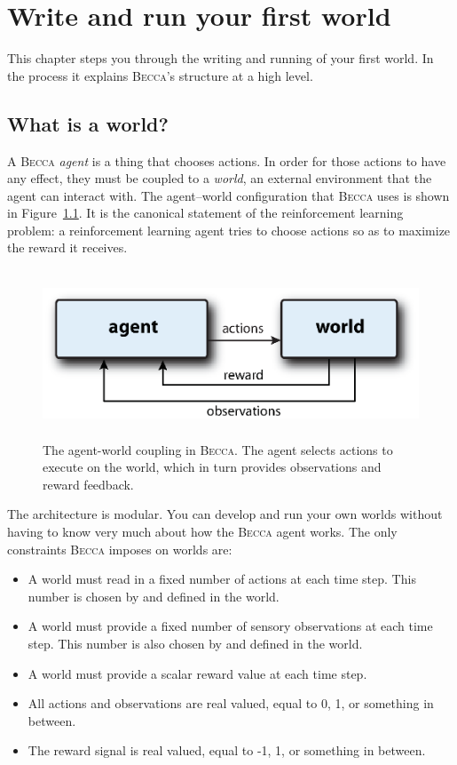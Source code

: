 \chapter{Write and run your first world}

This chapter steps you through the writing and running of your first world. In the process it explains \textsc{Becca}'s structure at a high level.

\section{What is a world?}

A \textsc{Becca} {\em agent} is a thing that chooses actions. In order for those actions to have any effect, they must be coupled to a {\em world}, an external environment that the agent can interact with. The agent--world configuration that \textsc{Becca} uses is shown in Figure~\ref{agent_world}. It is the canonical statement of the reinforcement learning problem: a reinforcement learning agent tries to choose actions so as to maximize the reward it receives.~\cite{sutton98} 

\begin{figure}
\centering
\includegraphics[height=5.0cm]{figs/agent_world.eps}
\caption{The agent-world coupling in \textsc{Becca}. The agent selects actions to execute on the world, which in turn provides observations and reward feedback.}
\label{agent_world}
\end{figure}

The architecture is modular. You can develop and run your own worlds without having to know very much about how the \textsc{Becca} agent works. The only constraints \textsc{Becca} imposes on worlds are:

\begin{itemize}
\item{A world must read in a fixed number of actions at each time step. This number is chosen by and defined in the world.}
\item{A world must provide a fixed number of sensory observations at each time step. This number is also chosen by and defined in the world.}
\item{A world must provide a scalar reward value at each time step.}
\item{All actions and observations are real valued, equal to 0, 1, or something in between.}
\item{The reward signal is real valued, equal to -1, 1, or something in between.}
\end{itemize}

